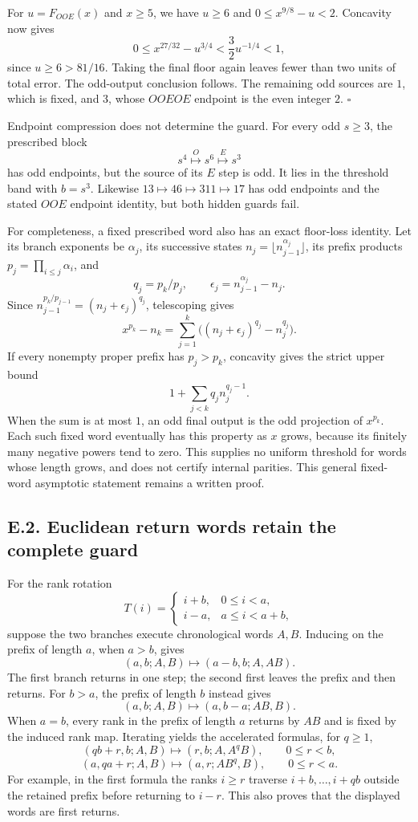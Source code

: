 \documentclass[12pt]{article}
\begin{document}
For \(u=F_{OOE}(x)\) and \(x\ge5\), we have \(u\ge6\) and
\(0\le x^{9/8}-u<2\). Concavity now gives \[
0\le x^{27/32}-u^{3/4}
<\frac32u^{-1/4}<1,
\] since \(u\ge6>81/16\). Taking the final floor again leaves fewer than
two units of total error. The odd-output conclusion follows. The
remaining odd sources are \(1\), which is fixed, and \(3\), whose
\(OOEOE\) endpoint is the even integer \(2\). \(\square\)

Endpoint compression does not determine the guard. For every odd
\(s\ge3\), the prescribed block \[
s^4\overset O\longmapsto s^6\overset E\longmapsto s^3
\] has odd endpoints, but the source of its \(E\) step is odd. It lies
in the threshold band with \(b=s^3\). Likewise
\(13\mapsto46\mapsto311\mapsto17\) has odd endpoints and the stated
\(OOE\) endpoint identity, but both hidden guards fail.

For completeness, a fixed prescribed word also has an exact floor-loss
identity. Let its branch exponents be \(\alpha_j\), its successive
states \(n_j=\lfloor n_{j-1}^{\alpha_j}\rfloor\), its prefix products
\(p_j=\prod_{i\le j}\alpha_i\), and \[
q_j=p_k/p_j,\qquad
\epsilon_j=n_{j-1}^{\alpha_j}-n_j.
\] Since \(n_{j-1}^{p_k/p_{j-1}}=(n_j+\epsilon_j)^{q_j}\), telescoping
gives \[
x^{p_k}-n_k=\sum_{j=1}^k
\bigl((n_j+\epsilon_j)^{q_j}-n_j^{q_j}\bigr).
\] If every nonempty proper prefix has \(p_j>p_k\), concavity gives the
strict upper bound \[
1+\sum_{j<k}q_jn_j^{q_j-1}.
\] When the sum is at most \(1\), an odd final output is the odd
projection of \(x^{p_k}\). Each such fixed word eventually has this
property as \(x\) grows, because its finitely many negative powers tend
to zero. This supplies no uniform threshold for words whose length
grows, and does not certify internal parities. This general fixed-word
asymptotic statement remains a written proof.

\subsection{E.2. Euclidean return words retain the complete
guard}\label{e.2.-euclidean-return-words-retain-the-complete-guard}

For the rank rotation \[
T(i)=
\begin{cases}
i+b,&0\le i<a,\\
i-a,&a\le i<a+b,
\end{cases}
\] suppose the two branches execute chronological words \(A,B\).
Inducing on the prefix of length \(a\), when \(a>b\), gives \[
(a,b;A,B)\longmapsto(a-b,b;A,AB).
\] The first branch returns in one step; the second first leaves the
prefix and then returns. For \(b>a\), the prefix of length \(b\) instead
gives \[
(a,b;A,B)\longmapsto(a,b-a;AB,B).
\] When \(a=b\), every rank in the prefix of length \(a\) returns by
\(AB\) and is fixed by the induced rank map. Iterating yields the
accelerated formulas, for \(q\ge1\), \[
(qb+r,b;A,B)\longmapsto(r,b;A,A^qB),\qquad 0\le r<b,
\] \[
(a,qa+r;A,B)\longmapsto(a,r;AB^q,B),\qquad 0\le r<a.
\] For example, in the first formula the ranks \(i\ge r\) traverse
\(i+b,\ldots,i+qb\) outside the retained prefix before returning to
\(i-r\). This also proves that the displayed words are first returns.
\end{document}
